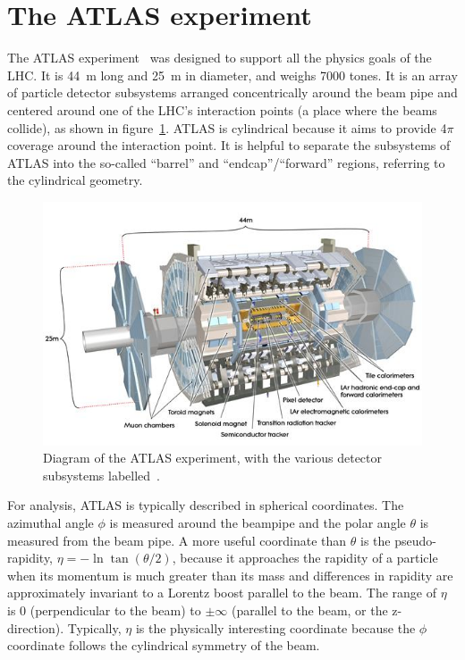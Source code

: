 \section{The ATLAS experiment}
\label{sec:atlas}

The ATLAS experiment~\cite{collaboration_atlas_2008} was designed to support all the physics goals of the LHC. It is \SI{44}{\meter} long and \SI{25}{\meter} in diameter, and weighs 7000 tones. It is an array of particle detector subsystems arranged concentrically around the beam pipe and centered around one of the LHC's interaction points (a place where the beams collide), as shown in figure~\ref{fig:atlas}. ATLAS is cylindrical because it aims to provide 4$\pi$ coverage around the interaction point. It is helpful to separate the subsystems of ATLAS into the so-called ``barrel'' and ``endcap''/``forward'' regions, referring to the cylindrical geometry. 

\begin{figure}
    \centering
    \includegraphics[width = \textwidth]{figures/atlas_diagram.png}
    \caption{Diagram of the ATLAS experiment, with the various detector subsystems labelled~\cite{collaboration_atlas_2008}.}
    \label{fig:atlas}
\end{figure}

For analysis, ATLAS is typically described in spherical coordinates. The azimuthal angle $\phi$ is measured around the beampipe and the polar angle $\theta$ is measured from the beam pipe. A more useful coordinate than $\theta$ is the pseudo-rapidity, $\eta = -\ln\tan\left(\theta/2\right)$, because it approaches the rapidity of a particle when its momentum is much greater than its mass and differences in rapidity are approximately invariant to a Lorentz boost parallel to the beam. The range of $\eta$ is 0 (perpendicular to the beam) to $\pm\infty$ (parallel to the beam, or the z-direction). Typically, $\eta$ is the physically interesting coordinate because the $\phi$ coordinate follows the cylindrical symmetry of the beam.

